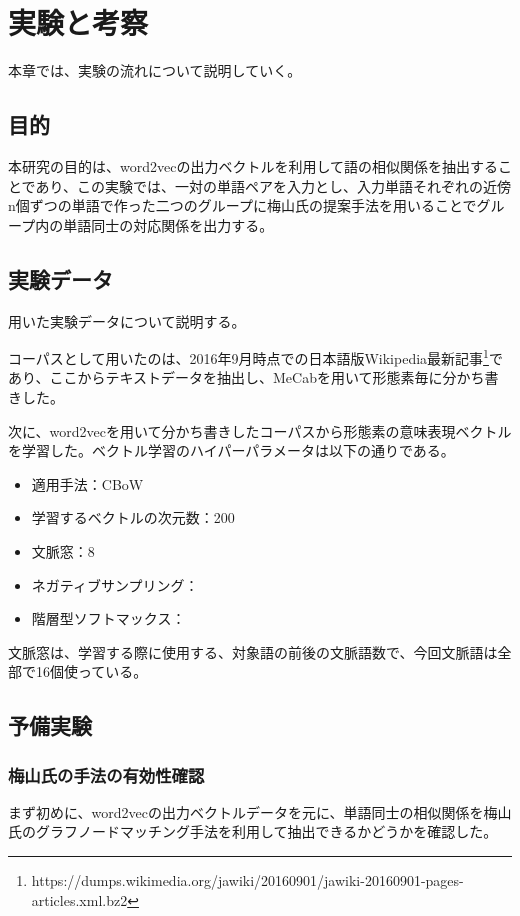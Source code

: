 \chapter{実験と考察}
本章では、実験の流れについて説明していく。

\section{目的}
本研究の目的は、word2vecの出力ベクトルを利用して語の相似関係を抽出することであり、この実験では、一対の単語ペアを入力とし、入力単語それぞれの近傍n個ずつの単語で作った二つのグループに梅山氏の提案手法を用いることでグループ内の単語同士の対応関係を出力する。

\section{実験データ}
用いた実験データについて説明する。

コーパスとして用いたのは、2016年9月時点での日本語版Wikipedia最新記事\footnote{https://dumps.wikimedia.org/jawiki/20160901/jawiki-20160901-pages-articles.xml.bz2}であり、ここからテキストデータを抽出し、MeCabを用いて形態素毎に分かち書きした。

次に、word2vecを用いて分かち書きしたコーパスから形態素の意味表現ベクトルを学習した。ベクトル学習のハイパーパラメータは以下の通りである。
\begin{itemize}
  \item 適用手法：CBoW
  \item 学習するベクトルの次元数：200
  \item 文脈窓：8
  \item ネガティブサンプリング：
  \item 階層型ソフトマックス：
\end{itemize}
文脈窓は、学習する際に使用する、対象語の前後の文脈語数で、今回文脈語は全部で16個使っている。

\section{予備実験}
\subsection{梅山氏の手法の有効性確認}
まず初めに、word2vecの出力ベクトルデータを元に、単語同士の相似関係を梅山氏のグラフノードマッチング手法を利用して抽出できるかどうかを確認した。
